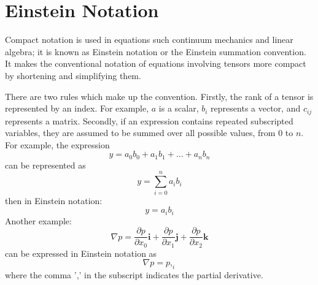 
%
%
%

\chapter{Einstein Notation}
\label{EINSTEIN NOTATION}

Compact notation is used in equations such continuum mechanics and linear
algebra; it is known as Einstein notation or the Einstein summation convention.
It makes the conventional notation of equations involving tensors more compact
by shortening and simplifying them.

There are two rules which make up the convention.
Firstly, the rank of a tensor is represented by an index.
For example, $a$ is a scalar, $b_{i}$ represents a vector, and $c_{ij}$
represents a matrix.
Secondly, if an expression contains repeated subscripted variables, they are
assumed to be summed over all possible values, from $0$ to $n$.
For example, the expression
\begin{equation}
y = a_{0}b_{0} + a_{1}b_{1} + \ldots + a_{n}b_{n}
\label{NOTATION1}
\end{equation}
can be represented as
\begin{equation}
y = \sum_{i=0}^n  a_{i}b_{i}
\label{NOTATION2}
\end{equation}
then in Einstein notation:
\begin{equation}
y = a_{i}b_{i}
\label{NOTATION3}
\end{equation}
%
Another example:
\begin{equation}
\nabla p = \frac{\partial p}{\partial x_{0}}\textbf{i} + \frac{\partial p}{\partial x_{1}}\textbf{j} + \frac{\partial p}{\partial x_{2}}\textbf{k}
\label{NOTATION4}
\end{equation}
can be expressed in Einstein notation as
\begin{equation}
\nabla p = p,_{i}
\label{NOTATION5}
\end{equation}
where the comma ',' in the subscript indicates the partial derivative.

